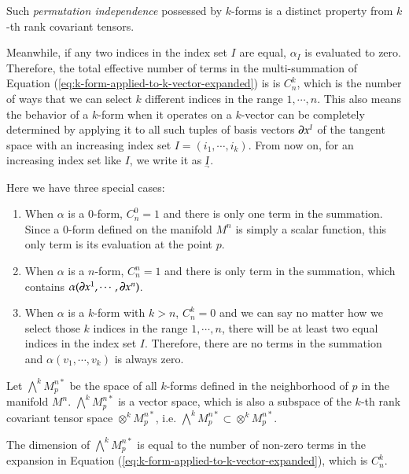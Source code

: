 \documentclass[11pt, a4paper]{book}
\begin{document}
\begin{Remark}
  Such \emph{permutation independence} possessed by $k$-forms is a distinct property from $k$-th
rank covariant tensors.
\end{Remark}
Meanwhile, if any two indices in the index set $I$ are equal, $\alpha_I$ is evaluated to
zero. Therefore, the total effective number of terms in the multi-summation of Equation
(\ref{eq:k-form-applied-to-k-vector-expanded}) is is $C_n^k$, which is the number of ways
that we can select $k$ different indices in the range $1,\cdots,n$. This also means the
behavior of a $k$-form when it operates on a $k$-vector can be completely determined by
applying it to all such tuples of basis vectors $\boldsymbol{\partial}x^I$ of the tangent space
with an increasing index set $I = (i_1,\cdots,i_k)$. From now on, for an increasing index
set like $I$, we write it as $\underaccent{\rightharpoondown}{I}$.

Here we have three special cases:
\begin{enumerate}
\item When $\alpha$ is a 0-form, $C_n^0 = 1$ and there is only one term in the summation.
  Since a 0-form defined on the manifold $M^n$ is simply a scalar function, this only term
  is its evaluation at the point $p$.
\item When $\alpha$ is a $n$-form, $C_n^n = 1$ and there is only term in the summation,
  which contains $\alpha(\boldsymbol{\partial}x^1,\cdots,\boldsymbol{\partial}x^n)$.
\item\label{item:zero-form} When $\alpha$ is a $k$-form with $k > n$, $C_n^k = 0$ and we
  can say no matter how we select those $k$ indices in the range $1,\cdots,n$, there will
  be at least two equal indices in the index set $I$. Therefore, there are no terms in the
  summation and $\alpha(v_1,\cdots,v_k)$ is always zero.
\end{enumerate}

\begin{Definition}
  Let $\bigwedge^k M_p^{n*}$ be the space of all $k$-forms defined in the neighborhood of
  $p$ in the manifold $M^n$. $\bigwedge^k M_p^{n*}$ is a vector space, which is also a
  subspace of the $k$-th rank covariant tensor space $\otimes^k M_p^{n*}$, i.e.
  $\bigwedge^k M_p^{n*} \subset \otimes^k M_p^{n*}$.
\end{Definition}
The dimension of $\bigwedge^k M_p^{n*}$ is equal to the number of non-zero terms in the
expansion in Equation (\ref{eq:k-form-applied-to-k-vector-expanded}), which is $C_n^k$.
\end{document}
